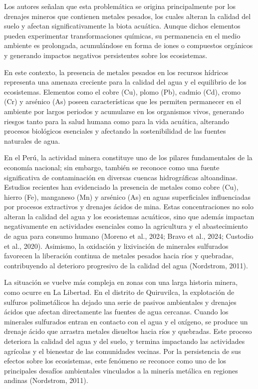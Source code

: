\documentclass[conference,10pt]{IEEEtran}
\begin{document}
Los autores señalan que esta problemática se origina principalmente 
por los drenajes mineros que contienen metales pesados, los cuales 
alteran la calidad del suelo y afectan significativamente la biota 
acuática. Aunque dichos elementos pueden experimentar transformaciones 
químicas, su permanencia en el medio ambiente es prolongada, 
acumulándose en forma de iones o compuestos orgánicos y generando 
impactos negativos persistentes sobre los ecosistemas. 

En este contexto, la presencia de metales pesados en los recursos 
hídricos representa una amenaza creciente para la calidad del agua 
y el equilibrio de los ecosistemas. Elementos como el cobre (Cu), 
plomo (Pb), cadmio (Cd), cromo (Cr) y arsénico (As) poseen 
características que les permiten permanecer en el ambiente por largos 
periodos y acumularse en los organismos vivos, generando riesgos 
tanto para la salud humana como para la vida acuática,  alterando 
procesos biológicos esenciales y afectando la sostenibilidad de 
las fuentes naturales de agua. 

En el Perú, la actividad minera constituye uno de los pilares 
fundamentales de la economía nacional; sin embargo, también se 
reconoce como una fuente significativa de contaminación en diversas 
cuencas hidrográficas altoandinas. Estudios recientes han evidenciado 
la presencia de metales como cobre (Cu), hierro (Fe), manganeso (Mn) 
y arsénico (As) en aguas superficiales influenciadas por procesos 
extractivos y drenajes ácidos de mina. Estas concentraciones no solo 
alteran la calidad del agua y los ecosistemas acuáticos, sino que 
además impactan negativamente en actividades esenciales como la 
agricultura y el abastecimiento de agua para consumo humano 
(Moreno et al., 2024; Bravo et al., 2024; Custodio et al., 2020). 
Asimismo, la oxidación y lixiviación de minerales sulfurados favorecen 
la liberación continua de metales pesados hacia ríos y quebradas, 
contribuyendo al deterioro progresivo de la calidad del agua 
(Nordstrom, 2011).

La situación se vuelve más compleja en zonas con una larga historia 
minera, como ocurre en La Libertad. En el distrito de Quiruvilca, la 
explotación de sulfuros polimetálicos ha dejado una serie de pasivos 
ambientales y drenajes ácidos que afectan directamente las fuentes de 
agua cercanas. Cuando los minerales sulfurados entran en contacto con 
el agua y el oxígeno, se produce un drenaje ácido que arrastra metales 
disueltos hacia ríos y quebradas. Este proceso deteriora la calidad del 
agua y del suelo, y termina impactando las actividades agrícolas y el 
bienestar de las comunidades vecinas. Por la persistencia de sus efectos 
sobre los ecosistemas, este fenómeno se reconoce como uno de los 
principales desafíos ambientales vinculados a la minería metálica en 
regiones andinas (Nordstrom, 2011).
\end{document}
